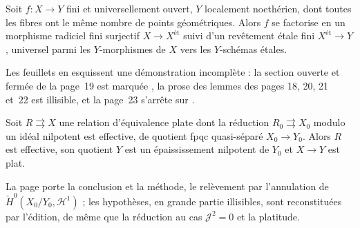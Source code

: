 
\begin{encadre}
\begin{theoreme*}\nonverifie
Soit $f : X \to Y$ fini et universellement ouvert, $Y$ localement noethérien, dont toutes les fibres ont le même nombre de points géométriques. Alors $f$ se factorise en un morphisme radiciel fini surjectif $X \to X^{\text{ét}}$ suivi d'un revêtement étale fini $X^{\text{ét}} \to Y$, universel parmi les $Y$-morphismes de $X$ vers les $Y$-schémas étales.
\end{theoreme*}
\end{encadre}
{\small Les feuillets en esquissent une démonstration incomplète : la section ouverte et fermée de la page~19 est marquée \q{[vérif]}, la prose des lemmes des pages 18, 20, 21 et~22 est illisible, et la page~23 s'arrête sur .\par}

\begin{encadre}
\begin{theoreme*}\nonverifie
Soit $R \rightrightarrows X$ une relation d'équivalence plate dont la réduction $R_0 \rightrightarrows X_0$ modulo un idéal nilpotent est effective, de quotient fpqc quasi-séparé $X_0 \to Y_0$. Alors $R$ est effective, son quotient $Y$ est un épaississement nilpotent de $Y_0$ et $X \to Y$ est plat.
\end{theoreme*}
\end{encadre}
{\small La page porte la conclusion et la méthode, le relèvement par l'annulation de $\check H^0(X_0/Y_0, \mathcal H^1)$ ; les hypothèses, en grande partie illisibles, sont reconstituées par l'édition, de même que la réduction au cas $\mathcal J^2 = 0$ et la platitude.\par}

